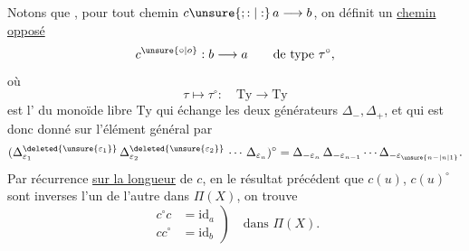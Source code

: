  Notons que , pour tout chemin $c\unsure{;:|:}\,a\longrightarrow b$,  on définit un \uline{chemin opposé}
\[c^{\unsure{\circ|o}}:b\longrightarrow a\qquad\text{de type }\tau^\circ,\]
où
\[\tau\longmapsto\tau^\circ:\quad\mathrm{Ty}\longrightarrow\mathrm{Ty}\]
est l'  du monoïde libre $\mathrm{Ty}$ qui échange les deux générateurs $\Delta_-,\Delta_+$, et qui  est donc donné sur l'élément général par
\[(\Delta_{\varepsilon_1}^{\deleted{\unsure{\varepsilon_1}}}\,\Delta_{\varepsilon_2}^{\deleted{\unsure{\varepsilon_2}}}\,\cdots\,\Delta_{\varepsilon_n})^\circ
=\Delta_{-\varepsilon_n}\,\Delta_{-\varepsilon_{n-1}}\cdots\Delta_{-\varepsilon_{\unsure{n-|n|1}}}.\]
Par récurrence \uline{sur la longueur} de $c$, en   le résultat précédent  que $c(u)$, $c(u)^\circ$ sont inverses l'un de l'autre dans $\Pi(X)$, on trouve
\[\left.\begin{aligned}c^\circ c&=\mathrm{id}_a\\cc^\circ&=\mathrm{id}_b\end{aligned}\right)\quad\text{dans }\Pi(X).\]

